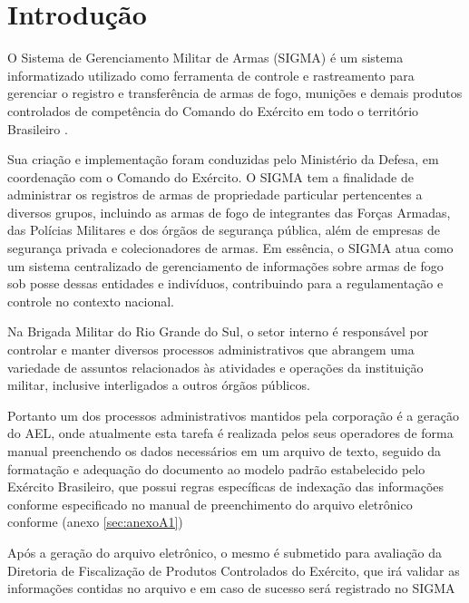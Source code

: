 \chapter{Introdução}

O Sistema de Gerenciamento Militar de Armas (SIGMA) é um sistema informatizado utilizado como ferramenta de controle e rastreamento para gerenciar o registro e transferência de armas de fogo, munições e demais produtos controlados de competência do Comando do Exército em todo o território Brasileiro 
\cite{ExércitoBrasileiro}.

Sua criação e implementação foram conduzidas pelo Ministério da Defesa, em coordenação com o Comando do Exército. O SIGMA tem a finalidade de administrar os registros de armas de propriedade particular pertencentes a diversos grupos, incluindo as armas de fogo de integrantes das Forças Armadas, das Polícias Militares e dos órgãos de segurança pública, além de empresas de segurança privada e colecionadores de armas. Em essência, o SIGMA atua como um sistema centralizado de gerenciamento de informações sobre armas de fogo sob posse dessas entidades e indivíduos, contribuindo para a regulamentação e controle no contexto nacional.
\cite{ExércitoBrasileiro}


Na Brigada Militar do Rio Grande do Sul, o setor interno é responsável por controlar e 
manter diversos processos administrativos que abrangem uma variedade de assuntos relacionados às atividades e operações da instituição militar, inclusive interligados a outros órgãos públicos. 
\cite{bmDepartamentoAdministrativo}

Portanto um dos processos administrativos mantidos pela corporação é a geração do AEL, onde atualmente esta tarefa é realizada pelos seus operadores de forma manual preenchendo os dados necessários em um arquivo de texto, seguido da formatação e adequação do documento ao modelo padrão estabelecido pelo Exército Brasileiro, que possui regras específicas de indexação das informações conforme especificado no manual de preenchimento do arquivo eletrônico conforme (anexo \ref{sec:anexoA1})   

Após a geração do arquivo eletrônico, o mesmo é submetido para avaliação da Diretoria de Fiscalização de Produtos Controlados do Exército, que irá validar as informações contidas no arquivo e em caso de sucesso será registrado no SIGMA\cite{ExércitoBrasileiro}

